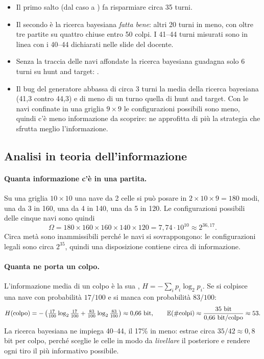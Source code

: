 \begin{itemize}
  \item Il primo salto (dal caso a ) fa risparmiare circa 35 turni.
  \item Il secondo è la ricerca bayesiana \emph{fatta bene}: altri 20 turni in meno, con
        oltre tre partite su quattro chiuse entro 50 colpi. I 41--44 turni misurati sono in
        linea con i 40--44 dichiarati nelle slide del docente.
  \item Senza la traccia delle navi affondate la ricerca bayesiana guadagna solo 6 turni su
        hunt and target: .
  \item Il bug del generatore abbassa di circa 3 turni la media della ricerca bayesiana
        (41,3 contro 44,3) e di meno di un turno quella di hunt and target. Con le navi
        confinate in una griglia $9\times 9$ le configurazioni possibili sono meno, quindi
        c'è meno informazione da scoprire: ne approfitta di più la strategia che sfrutta
        meglio l'informazione.
\end{itemize}

\subsection{Analisi in teoria dell'informazione}

\paragraph{Quanta informazione c'è in una partita.}
Su una griglia $10\times10$ una nave da 2 celle si può posare in $2 \times 10 \times 9 = 180$
modi, una da 3 in 160, una da 4 in 140, una da 5 in 120. Le configurazioni possibili delle
cinque navi sono quindi
\[
  \Omega = 180 \times 160 \times 160 \times 140 \times 120 = 7{,}74\cdot 10^{10}
         \approx 2^{36{,}17}.
\]
Circa metà sono inammissibili perché le navi si sovrappongono: le configurazioni legali sono
circa $2^{35}$, quindi una disposizione contiene circa  di informazione.

\paragraph{Quanta ne porta un colpo.}
L'informazione media di un colpo è la sua ,
$H = -\sum_i p_i \log_2 p_i$. Se si colpisce una nave con probabilità $17/100$ e si manca
con probabilità $83/100$:
\[
  H(\text{colpo}) = -\left(\tfrac{17}{100}\log_2\tfrac{17}{100}
                    + \tfrac{83}{100}\log_2\tfrac{83}{100}\right) \approx 0{,}66 \text{ bit},
  \qquad
  \mathbb{E}(\#\text{colpi}) \approx \frac{35 \text{ bit}}{0{,}66 \text{ bit/colpo}} \approx 53 .
\]
La ricerca bayesiana ne impiega 40--44, il 17\% in meno: estrae circa $35/42 \approx
0{,}8$ bit per colpo, perché sceglie le celle in modo da \emph{livellare} il posteriore e
rendere ogni tiro il più informativo possibile.

